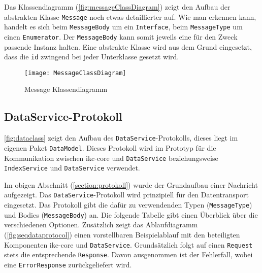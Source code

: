 Das Klassendiagramm (\autoref{fig:messageClassDiagram}) zeigt den Aufbau der abstrakten Klasse \texttt{Message} noch etwas detaillierter auf. Wie man erkennen kann, handelt es sich beim \texttt{MessageBody} um ein \texttt{Interface}, beim \texttt{MessageType} um einen \texttt{Enumerator}. Der \texttt{MessageBody} kann somit jeweils eine für den Zweck passende Instanz halten. Eine abstrakte Klasse wird aus dem Grund eingesetzt, dass die \texttt{id} zwingend bei jeder Unterklasse gesetzt wird.

    \begin{figure}[H]
    \centering
    \texttt{[image: MessageClassDiagram]}
    \caption{Message Klassendiagramm}
    \label{fig:messageClassDiagram}
    \end{figure}



\subsection{DataService-Protokoll}


\autoref{fig:dataclass} zeigt den Aufbau des \texttt{DataService}-Protokolls, dieses liegt im eigenen Paket \texttt{DataModel}. Dieses Protokoll wird im Prototyp für die Kommunikation zwischen \gls{ikc-core} und \texttt{DataService} beziehungsweise \texttt{IndexService} und \texttt{DataService} verwendet.

Im obigen Abschnitt (\autoref{section:protokoll}) wurde der Grundaufbau einer Nachricht aufgezeigt. Das \texttt{DataService}-Protokoll wird prinzipiell für den Datentransport eingesetzt. Das Protokoll gibt die dafür zu verwendenden Typen (\texttt{MessageType}) und Bodies (\texttt{MessageBody}) an. Die folgende Tabelle gibt einen Überblick über die verschiedenen Optionen. Zusätzlich zeigt das Ablaufdiagramm (\autoref{fig:seqdataprotocol}) einen vorstellbaren Beispielablauf mit den beteiligten Komponenten \gls{ikc-core} und \texttt{DataService}. Grundsätzlich folgt auf einen \texttt{Request} stets die entsprechende \texttt{Response}. Davon ausgenommen ist der Fehlerfall, wobei eine \texttt{ErrorResponse} zurückgeliefert wird.

